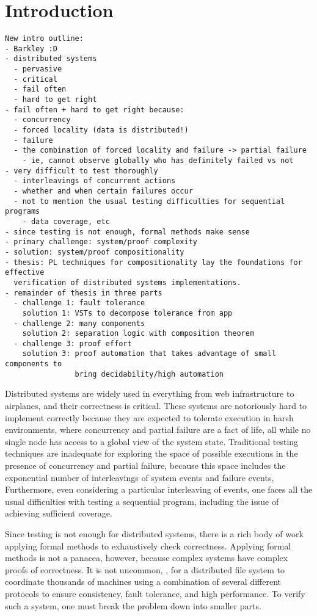 \chapter{Introduction}
\label{chap:intro}

\begin{verbatim}
New intro outline:
- Barkley :D
- distributed systems
  - pervasive
  - critical
  - fail often
  - hard to get right
- fail often + hard to get right because:
  - concurrency
  - forced locality (data is distributed!)
  - failure
  - the combination of forced locality and failure -> partial failure
    - ie, cannot observe globally who has definitely failed vs not
- very difficult to test thoroughly
  - interleavings of concurrent actions
  - whether and when certain failures occur
  - not to mention the usual testing difficulties for sequential programs
    - data coverage, etc
- since testing is not enough, formal methods make sense
- primary challenge: system/proof complexity
- solution: system/proof compositionality
- thesis: PL techniques for compositionality lay the foundations for effective
  verification of distributed systems implementations.
- remainder of thesis in three parts
  - challenge 1: fault tolerance
    solution 1: VSTs to decompose tolerance from app
  - challenge 2: many components
    solution 2: separation logic with composition theorem
  - challenge 3: proof effort
    solution 3: proof automation that takes advantage of small components to
                bring decidability/high automation
\end{verbatim}

Distributed systems are widely used
  in everything from web infrastructure to airplanes,
  and their correctness is critical.
These systems are notoriously hard to implement correctly
  because they are expected to tolerate execution in harsh environments,
  where concurrency and partial failure are a fact of life,
  all while no single node has access to a global view of the system state.
Traditional testing techniques are inadequate
  for exploring the space of possible executions
  in the presence of concurrency and partial failure,
  because this space includes the exponential number of
  interleavings of system events and failure events,
Furthermore, even considering a particular interleaving of events,
  one faces all the usual difficulties with testing a sequential program,
  including the issue of achieving sufficient coverage.

Since testing is not enough for distributed systems,
  there is a rich body of work applying formal methods
  to exhaustively check correctness.
Applying formal methods is not a panacea, however,
  because complex systems have complex proofs of correctness.
It is not uncommon, \eg,
  for a  distributed file system to coordinate thousands of machines
  using a combination of several different protocols to ensure
  consistency, fault tolerance, and high performance.
To verify such a system,
  one must break the problem down into smaller parts.

